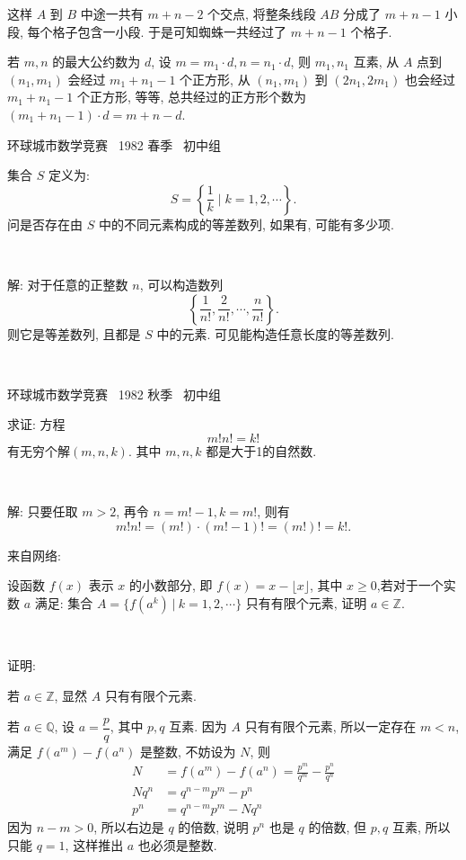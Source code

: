 这样 $A$ 到 $B$ 中途一共有 $m+n-2$  个交点, 将整条线段 $AB$ 分成了 $m+n-1$ 小段, 每个格子包含一小段. 于是可知蜘蛛一共经过了 $m+n-1$ 个格子.

若 $m,n$ 的最大公约数为 $d$, 设 $m = m_1\cdot d, n = n_1\cdot d$, 则 $m_1, n_1$ 互素, 从 $A$ 点到 $(n_1,m_1)$ 会经过 $m_1+n_1-1$ 个正方形, 从 $(n_1,m_1)$ 到 $(2n_1,2m_1)$ 也会经过 $m_1+n_1-1$ 个正方形, 等等, 总共经过的正方形个数为 $(m_1+n_1-1)\cdot d = m+n-d$.

\newpage

\noindent 环球城市数学竞赛~ 1982 春季~ 初中组

集合 $ S $ 定义为: \[ S = \left\{ \frac{1}{k} \mid k = 1, 2, \cdots \right\} .\] 问是否存在由 $ S $ 中的不同元素构成的等差数列, 如果有, 可能有多少项.

~

解: 对于任意的正整数 $ n $, 可以构造数列 \[ \left\{ \frac{1}{n!}, \frac{2}{n!}, \cdots, \frac{n}{n!} \right\}. \]
则它是等差数列, 且都是 $ S $ 中的元素. 可见能构造任意长度的等差数列.

~


\noindent 环球城市数学竞赛~ 1982 秋季~ 初中组

求证: 方程
\[m!n!=k!\]
有无穷个解$(m,n,k)$. 其中 $m,n,k$ 都是大于1的自然数.

~

解: 只要任取 $m>2$, 再令 $n = m!-1, k=m!$, 则有 
$$m!n!=(m!)\cdot(m!-1)!=(m!)!=k! .$$


\newpage

\noindent 来自网络:

设函数 $f(x)$ 表示 $x$ 的小数部分, 即 $f(x) = x - \lfloor x \rfloor$, 其中 $x\ge 0$,若对于一个实数 $a$ 满足: 集合 $A = \{ f(a^k)\ |\ k = 1,2,\cdots \}$ 只有有限个元素, 证明 $a\in \mathbb{Z}$.

~

\noindent 证明: 

若 $a\in \mathbb{Z}$, 显然 $A$ 只有有限个元素.

若 $a \in \mathbb{Q}$, 设 $a = \dfrac{p}{q}$, 其中 $p,q$ 互素. 因为 $A$ 只有有限个元素, 所以一定存在 $m < n$, 满足 $f(a^m) - f(a^n)$ 是整数, 不妨设为 $N$, 则
\begin{align*}
N &= f(a^m) - f(a^n) = \frac{p^m}{q^m} - \frac{p^n}{q^n}\\
Nq^n & = q^{n-m}p^m - p^n\\
p^n &= q^{n-m}p^m - Nq^n
\end{align*}
因为 $n-m > 0$, 所以右边是 $q$ 的倍数, 说明 $p^n$ 也是  $q$ 的倍数, 但 $p,q$ 互素, 所以只能 $q=1$, 这样推出 $a$ 也必须是整数. 


